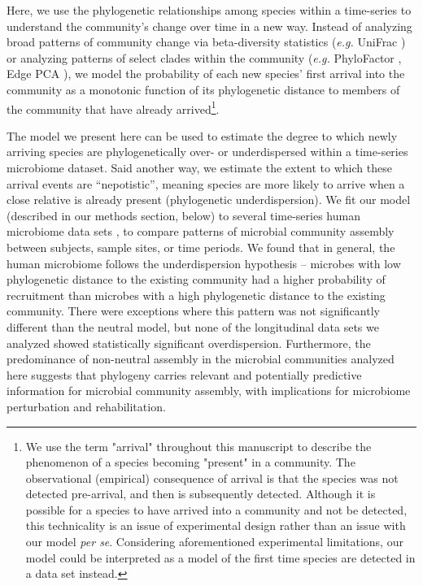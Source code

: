 \documentclass{article}
\begin{document}
Here, we use the phylogenetic relationships among species within a time-series to understand the community’s change over time in a new way. Instead of analyzing broad patterns of community change via beta-diversity statistics (\emph{e.g.} UniFrac \cite{Lozupone2005}) or analyzing patterns of select clades within the community (\emph{e.g.} PhyloFactor \cite{Washburne2017}, Edge PCA \cite{Matsen2013}), we model the probability of each new species’ first arrival into the community as a monotonic function of its phylogenetic distance to members of the community that have already arrived\footnote{We use the term "arrival" throughout this manuscript to describe the phenomenon of a species becoming "present" in a community. The observational (empirical) consequence of arrival is that the species was not detected pre-arrival, and then is subsequently detected. Although it is possible for a species to have arrived into a community and not be detected, this technicality is an issue of experimental design rather than an issue with our model \emph{per se}. Considering aforementioned experimental limitations, our model could be interpreted as a model of the first time species are detected in a data set instead.}.
\par
The model we present here can be used to estimate the degree to which newly arriving species are phylogenetically over- or underdispersed within a time-series microbiome dataset. Said another way, we estimate the extent to which these arrival events are “nepotistic”, meaning species are more likely to arrive when a close relative is already present (phylogenetic underdispersion). We fit our model (described in our methods section, below) to several time-series human microbiome data sets \cite{Caporaso2011,Koenig2011,Yassour2016}, to compare patterns of microbial community assembly between subjects, sample sites, or time periods. We found that in general, the human microbiome follows the underdispersion hypothesis – microbes with low phylogenetic distance to the existing community had a higher probability of recruitment than microbes with a high phylogenetic distance to the existing community. There were exceptions where this pattern was not significantly different than the neutral model, but none of the longitudinal data sets we analyzed showed statistically significant overdispersion. Furthermore, the predominance of non-neutral assembly in the microbial communities analyzed here suggests that phylogeny carries relevant and potentially predictive information for microbial community assembly, with implications for microbiome perturbation and rehabilitation. 
\\\par
\end{document}
